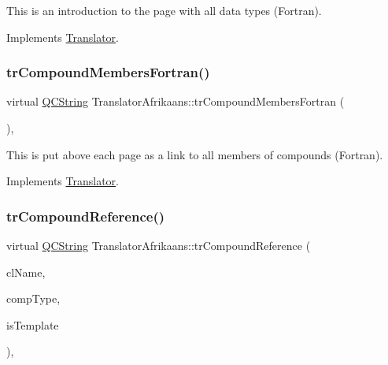 This is an introduction to the page with all data types (Fortran). 

Implements \mbox{\hyperlink{class_translator}{Translator}}.

\mbox{\label{class_translator_afrikaans_a90194c6ac3dd1385f5b6554a5e8bfc6e}} 
\subsubsection{\texorpdfstring{trCompoundMembersFortran()}{trCompoundMembersFortran()}}
{\footnotesize\ttfamily virtual \mbox{\hyperlink{class_q_c_string}{Q\+C\+String}} Translator\+Afrikaans\+::tr\+Compound\+Members\+Fortran (\begin{DoxyParamCaption}{ }\end{DoxyParamCaption})\hspace{0.3cm}{\ttfamily [inline]}, {\ttfamily [virtual]}}

This is put above each page as a link to all members of compounds (Fortran). 

Implements \mbox{\hyperlink{class_translator}{Translator}}.

\mbox{\label{class_translator_afrikaans_a5f40b78078e803bb1ca52daa3fe591e9}} 
\subsubsection{\texorpdfstring{trCompoundReference()}{trCompoundReference()}}
{\footnotesize\ttfamily virtual \mbox{\hyperlink{class_q_c_string}{Q\+C\+String}} Translator\+Afrikaans\+::tr\+Compound\+Reference (\begin{DoxyParamCaption}\item[{const char $\ast$}]{cl\+Name,  }\item[{\mbox{\hyperlink{class_class_def_ae70cf86d35fe954a94c566fbcfc87939}{Class\+Def\+::\+Compound\+Type}}}]{comp\+Type,  }\item[{bool}]{is\+Template }\end{DoxyParamCaption})\hspace{0.3cm}{\ttfamily [inline]}, {\ttfamily [virtual]}}

